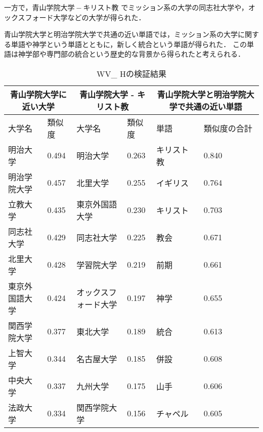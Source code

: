 一方で，$ 青山学院大学 - キリスト教 $ でミッション系の大学の同志社大学や，オックスフォード大学などの大学が得られた．

青山学院大学と明治学院大学で共通の近い単語では，ミッション系の大学に関する単語や神学という単語とともに，新しく統合という単語が得られた．
この単語は神学部や専門部の統合という歴史的な背景から得られたと考えられる．

\begin{table}[H]
\caption{WV\_ Hの検証結果}
\centering
\footnotesize
\begin{tabular}{ll|ll|ll}
\hline
\multicolumn{2}{c}{青山学院大学に近い大学} & \multicolumn{2}{c}{青山学院大学 - キリスト教} & \multicolumn{2}{c}{青山学院大学と明治学院大学で共通の近い単語}
\\ \hline
大学名 & 類似度 & 大学名 & 類似度 & 単語 & 類似度の合計
\\ \hline \hline
明治大学 & 0.494 & 明治大学 & 0.263 & キリスト教 & 0.840\\
明治学院大学 & 0.457 & 北里大学 & 0.255 & イギリス & 0.764\\
立教大学 & 0.435 & 東京外国語大学 & 0.230 & キリスト & 0.703\\
同志社大学 & 0.429 & 同志社大学 & 0.225 & 教会 & 0.671\\
北里大学 & 0.428 & 学習院大学 & 0.219 & 前期 & 0.661\\
東京外国語大学 & 0.424 & オックスフォード大学 & 0.197 & 神学 & 0.655\\
関西学院大学 & 0.377 & 東北大学 & 0.189 & 統合 & 0.613\\
上智大学 & 0.344 & 名古屋大学 & 0.185 & 併設 & 0.608\\
中央大学 & 0.337 & 九州大学 & 0.175 & 山手 & 0.606\\
法政大学 & 0.334 & 関西学院大学 & 0.156 & チャペル & 0.605\\ \hline
\end{tabular}
\label{table:wvh}
\end{table}